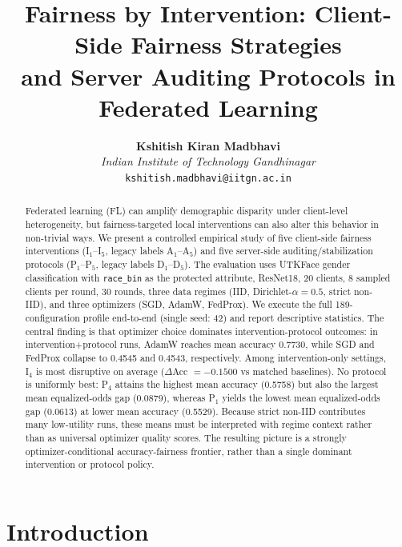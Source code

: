 ﻿\documentclass{article}
\title{Fairness by Intervention: Client-Side Fairness Strategies\\
  and Server Auditing Protocols in Federated Learning}
\author{%
  \textbf{Kshitish Kiran Madbhavi}\\
  \textit{Indian Institute of Technology Gandhinagar}\\
  \texttt{kshitish.madbhavi@iitgn.ac.in}
}
\begin{document}
\maketitle

\begin{abstract}
Federated learning (FL) can amplify demographic disparity under
client-level heterogeneity, but fairness-targeted local interventions
can also alter this behavior in non-trivial ways.
We present a controlled empirical study of five client-side fairness
interventions (I$_1$--I$_5$, legacy labels A$_1$--A$_5$) and five
server-side auditing/stabilization protocols
(P$_1$--P$_5$, legacy labels D$_1$--D$_5$).
The evaluation uses UTKFace gender classification with
\texttt{race\_bin} as the protected attribute, ResNet18, 20 clients,
8 sampled clients per round, 30 rounds, three data regimes
(IID, Dirichlet-$\alpha{=}0.5$, strict non-IID), and three optimizers
(SGD, AdamW, FedProx).
We execute the full 189-configuration profile end-to-end
(single seed: 42) and report descriptive statistics.
The central finding is that optimizer choice dominates
intervention-protocol outcomes: in intervention+protocol runs, AdamW
reaches mean accuracy 0.7730,
while SGD and FedProx collapse to 0.4545 and 0.4543, respectively.
Among intervention-only settings, I$_4$ is most disruptive on average
($\Delta$Acc $=-0.1500$ vs matched baselines).
No protocol is uniformly best: P$_4$ attains the highest mean accuracy
(0.5758) but also the largest mean equalized-odds gap (0.0879),
whereas P$_1$ yields the lowest mean equalized-odds gap (0.0613) at
lower mean accuracy (0.5529).
Because strict non-IID contributes many low-utility runs, these means
must be interpreted with regime context rather than as universal
optimizer quality scores.
The resulting picture is a strongly optimizer-conditional
accuracy-fairness frontier, rather than a single dominant
intervention or protocol policy.
\end{abstract}

\section{Introduction}
\label{sec:intro}
\end{document}
